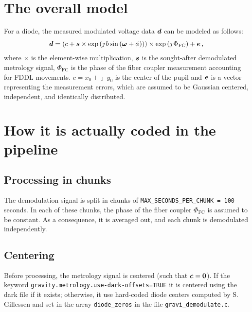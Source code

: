 \documentclass[a4paper,11pt,twoside]{scrartcl}
\begin{document}
\section{The overall model}
For a diode, the measured modulated voltage data $\boldsymbol{d}$ can be modeled as follows:
\begin{equation}
    \boldsymbol{d} = \left( c + \boldsymbol{s} \times  \exp\left( \jmath \, b \sin\left( \boldsymbol{\omega} + \phi\right)\right)\right)\times\exp\left(\jmath\,\Phi_\textrm{FC}\right)+  \boldsymbol{e}\,,\label{eq:model}
\end{equation}
where $\times$ is the element-wise multiplication, $\boldsymbol{s}$ is the sought-after demodulated  metrology signal, $\Phi_\textrm{FC}$ is the phase of the fiber coupler measurement accounting for FDDL movements. $c  = x_0 + \jmath\,y_0$ is the center of the pupil and $\boldsymbol{e}$ is a vector representing the measurement errors, which are assumed to be Gaussian centered, independent, and identically distributed.




\section{How it is actually coded in the pipeline}

\subsection{Processing in chunks}
The demodulation signal is split in chunks of  \verb+MAX_SECONDS_PER_CHUNK = 100+ seconds. In each of these chunks, the phase of the fiber coupler $\Phi_\textrm{FC}$ is assumed to be constant. As a consequence, it is averaged out, and each chunk is demodulated independently. 

\subsection{Centering}
Before processing, the metrology signal is centered (such that $\boldsymbol{c}=\boldsymbol{0}$). If the keyword \verb+gravity.metrology.use-dark-offsets=TRUE+  it is centered using the dark file if it exists; otherwise, it use hard-coded diode centers computed by S. Gillessen and set in the array \verb+diode_zeros+ in the file \verb|gravi_demodulate.c|. 
\end{document}
